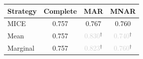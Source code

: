 \begin{tabular}{lccc}
    \toprule
    Strategy  & Complete & MAR                    & MNAR                   \\
    \midrule
    MICE      & 0.757   & 0.767                 & 0.760                 \\
    Mean      & 0.757   & \textcolor{lightgray}{0.830}$^\dagger$& \textcolor{lightgray}{0.740}$^\dagger$\\
    Marginal  & 0.757   & \textcolor{lightgray}{0.823}$^\dagger$& \textcolor{lightgray}{0.760}$^\dagger$\\
    \bottomrule
\end{tabular}
